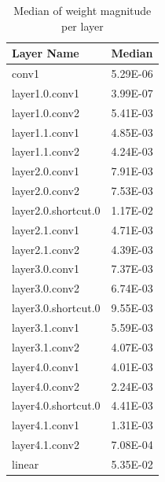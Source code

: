 \begin{table}[!htb]
    \centering
    \caption{Median of weight magnitude per layer}
    \begin{tabular}{|l|l|}
    \hline
        \textbf{Layer Name} & \textbf{Median} \\ \hline
        conv1 & 5.29E-06 \\ \hline
        layer1.0.conv1 & 3.99E-07 \\ \hline
        layer1.0.conv2 & 5.41E-03 \\ \hline
        layer1.1.conv1 & 4.85E-03 \\ \hline
        layer1.1.conv2 & 4.24E-03 \\ \hline
        layer2.0.conv1 & 7.91E-03 \\ \hline
        layer2.0.conv2 & 7.53E-03 \\ \hline
        layer2.0.shortcut.0 & 1.17E-02 \\ \hline
        layer2.1.conv1 & 4.71E-03 \\ \hline
        layer2.1.conv2 & 4.39E-03 \\ \hline
        layer3.0.conv1 & 7.37E-03 \\ \hline
        layer3.0.conv2 & 6.74E-03 \\ \hline
        layer3.0.shortcut.0 & 9.55E-03 \\ \hline
        layer3.1.conv1 & 5.59E-03 \\ \hline
        layer3.1.conv2 & 4.07E-03 \\ \hline
        layer4.0.conv1 & 4.01E-03 \\ \hline
        layer4.0.conv2 & 2.24E-03 \\ \hline
        layer4.0.shortcut.0 & 4.41E-03 \\ \hline
        layer4.1.conv1 & 1.31E-03 \\ \hline
        layer4.1.conv2 & 7.08E-04 \\ \hline
        linear & 5.35E-02 \\ \hline
    \end{tabular}
    \label{tab:Q50perLayer}
\end{table}




   



